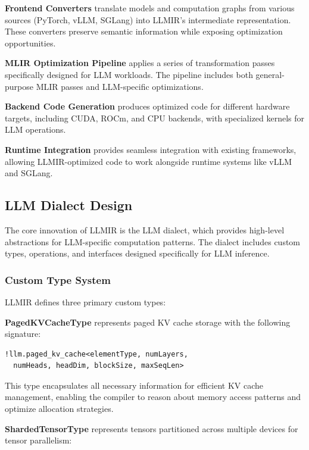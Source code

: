 \documentclass[conference]{IEEEtran}
\begin{document}
\textbf{Frontend Converters} translate models and computation graphs from various sources (PyTorch, vLLM, SGLang) into LLMIR's intermediate representation. These converters preserve semantic information while exposing optimization opportunities.

\textbf{MLIR Optimization Pipeline} applies a series of transformation passes specifically designed for LLM workloads. The pipeline includes both general-purpose MLIR passes and LLM-specific optimizations.

\textbf{Backend Code Generation} produces optimized code for different hardware targets, including CUDA, ROCm, and CPU backends, with specialized kernels for LLM operations.

\textbf{Runtime Integration} provides seamless integration with existing frameworks, allowing LLMIR-optimized code to work alongside runtime systems like vLLM and SGLang.

\subsection{LLM Dialect Design}

The core innovation of LLMIR is the LLM dialect, which provides high-level abstractions for LLM-specific computation patterns. The dialect includes custom types, operations, and interfaces designed specifically for LLM inference.

\subsubsection{Custom Type System}

LLMIR defines three primary custom types:

\textbf{PagedKVCacheType} represents paged KV cache storage with the following signature:

\begin{mlircode}
\begin{lstlisting}[style=mlir]
!llm.paged_kv_cache<elementType, numLayers, 
  numHeads, headDim, blockSize, maxSeqLen>
\end{lstlisting}
\end{mlircode}

This type encapsulates all necessary information for efficient KV cache management, enabling the compiler to reason about memory access patterns and optimize allocation strategies.

\textbf{ShardedTensorType} represents tensors partitioned across multiple devices for tensor parallelism:
\end{document}
